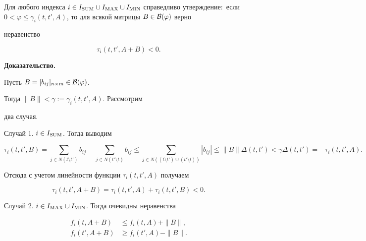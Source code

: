 \begin{lem}


Для любого индекса $i \in I_{\SUM}\cup


I_{\MAX}\cup I_{\MIN}$ справедливо утверждение$:$ если $0<\varphi\leq


\gamma_{i}(t,t',A)$, то для всякой матрицы $B \in \cal B(\varphi)$ верно


неравенство


$$


\tau_{i}(t,t',A+B)<0.


$$


\end{lem}





{\bf Доказательство.}


Пусть $B =[b_{ij}]_{n\times m} \in {\cal B}(\varphi)$.


Тогда $\| B \| < \gamma:=\gamma_{i}(t,t',A)$. Рассмотрим


два случая.





Случай 1. $i \in I_{\operatorname{SUM}}$. Тогда выводим





$$


\tau_{i}(t,t',B) = \sum_{j \in N(t\setminus t')}b_{ij} -


\sum_{j \in N(t'\setminus t)}b_{ij} \leq


\sum_{j \in N((t\setminus t') \cup (t'\setminus t))}|b_{ij}|


\leq \| B \|\Delta(t,t')


< \gamma\Delta(t,t')=-\tau_i(t,t',A).


$$


Отсюда с учетом линейности функции $\tau_i(t,t',A)$ получаем


$$


\tau_{i}(t,t',A+B) = \tau_{i}(t,t',A) + \tau_{i}(t,t',B) < 0.


$$





Случай 2. $i \in I_{\operatorname{MAX}}\cup I_{\operatorname{MIN}}$. Тогда очевидны неравенства


\begin{align*}


f_{i}(t,A+B) &\leq f_{i}(t,A) + \| B \|, \\


f_{i}(t',A+B) &\geq f_{i}(t',A) - \| B \|.


\end{align*}


